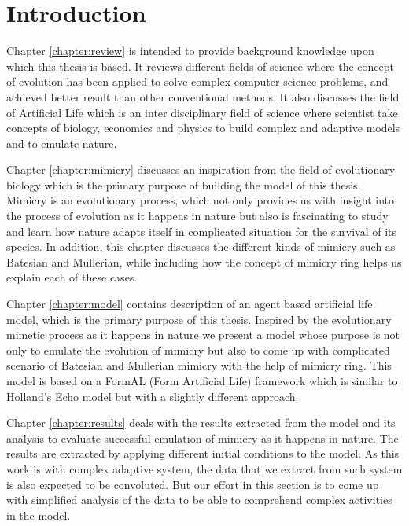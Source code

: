 \chapter{Introduction}
\label{chapter:introduction}


Chapter \ref{chapter:review} is intended to provide background knowledge upon which this thesis is based. It reviews different fields of science where the concept of evolution has been applied to solve complex computer science problems, and achieved better result than other conventional methods. It also discusses the field of Artificial Life which is an inter disciplinary field of science where scientist take concepts of biology, economics and physics to build complex and adaptive models and to emulate nature. 

Chapter \ref{chapter:mimicry} discusses an inspiration from the field of evolutionary biology which is the primary purpose of building the model of this thesis. Mimicry is an evolutionary process, which not only provides us with insight into the process of evolution as it happens in nature but also is fascinating to study and learn how nature adapts itself in complicated situation for the survival of its species. In addition, this chapter discusses the different kinds of mimicry such as Batesian and Mullerian, while including how the concept of mimicry ring helps us explain each of these cases. 

Chapter \ref{chapter:model} contains description of an agent based artificial life model, which is the primary purpose of this thesis. Inspired by the evolutionary mimetic process as it happens in nature we present a model whose purpose is not only to emulate the evolution of mimicry but also to come up with complicated scenario of Batesian and Mullerian mimicry with the help of mimicry ring. This model is based on a FormAL (Form Artificial Life) framework which is similar to Holland's Echo model but with a slightly different approach. 

Chapter \ref{chapter:results} deals with the results extracted from the model and its analysis to evaluate successful emulation of mimicry as it happens in nature. The results are extracted by applying different initial conditions to the model. As this work is with complex adaptive system, the data that we extract from such system is also expected to be convoluted. But our effort in this section is to come up with simplified analysis of the data to be able to comprehend complex activities in the model. 

